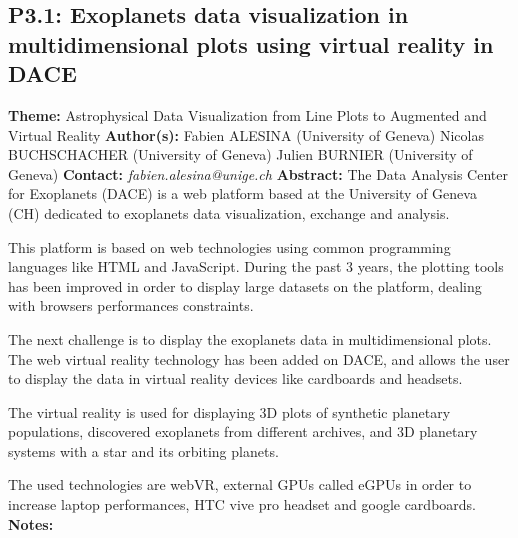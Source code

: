 \documentclass{report}
\begin{document}
{{{\subsection*{P3.1: Exoplanets data visualization in multidimensional plots using virtual reality in DACE}
{\bf Theme:}  Astrophysical Data Visualization from Line Plots to Augmented and Virtual Reality\newline
{\bf Author(s):}\newline
Fabien ALESINA (University of Geneva) \newline Nicolas BUCHSCHACHER (University of Geneva) \newline  Julien BURNIER (University of Geneva)\newline   \newline  \newline  \newline\newline
{\bf Contact:} {\it fabien.alesina@unige.ch}\newline
\newline\newline
{\bf Abstract:}\newline
The Data Analysis Center for Exoplanets (DACE) is a web platform based at the University of Geneva (CH) dedicated to exoplanets data visualization, exchange and analysis.

This platform is based on web technologies using common programming languages like HTML and JavaScript. During the past 3 years, the plotting tools has been improved in order to display large datasets on the platform, dealing with browsers performances constraints.

The next challenge is to display the exoplanets data in multidimensional plots. The web virtual reality technology has been added on DACE, and allows the user to display the data in virtual reality devices like cardboards and headsets. 

The virtual reality is used for displaying 3D plots of synthetic planetary populations, discovered exoplanets from different archives, and 3D planetary systems with a star and its orbiting planets.

The used technologies are webVR, external GPUs called eGPUs in order to increase laptop performances, HTC vive pro headset and google cardboards.\newline
{\bf Notes:}\newline
{\newpage
}}}}
\end{document}
